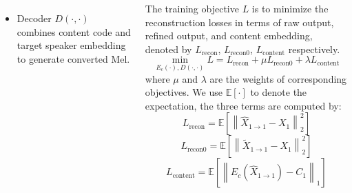 \documentclass[20pt,margin=1in,innermargin=-4.5in,blockverticalspace=-0.25in]{tikzposter}
\begin{document}
\begin{columns}
{\begin{itemize}
			\item Decoder $D(\cdot,\cdot)$ combines content code and target speaker embedding to generate converted Mel.
		\end{itemize}
		The training objective $L$ is to minimize the reconstruction losses in terms of raw output, refined output, and content embedding, denoted by $L_{\text{recon}}$, $L_{\text{recon0}}$, $L_{\text{content}}$ respectively.
    \[\min_{E_c(\cdot),D(\cdot,\cdot)} L = L_{\text{recon}} + \mu L_{\text{recon0}} + \lambda L_{\text{content}}\]
    where $\mu$ and $\lambda$ are the weights of corresponding objectives. We use $\mathbb{E}[\cdot]$ to denote the expectation, the three terms are computed by:
    \[L_{\text{recon}} = \mathbb{E}\left[\left\|\hat{X}_{1\rightarrow 1} - X_1\right\|^2_2\right] \]
    \[L_{\text{recon0}} = \mathbb{E}\left[\left\|\tilde{X}_{1\rightarrow 1} - X_1\right\|^2_2\right]\]
    \[L_{\text{content}} = \mathbb{E}\left[\left\|E_c(\hat{X}_{1\rightarrow 1}) - C_1\right\|_1\right]\]
	}

\end{columns}
\end{document}
